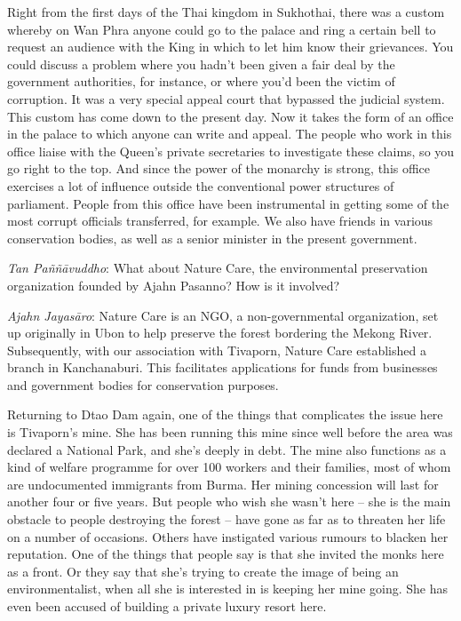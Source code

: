 Right from the first days of the Thai kingdom in Sukhothai, there was a
custom whereby on Wan Phra anyone could go to the palace and ring a
certain bell to request an audience with the King in which to let him
know their grievances. You could discuss a problem where you hadn't been
given a fair deal by the government authorities, for instance, or where
you'd been the victim of corruption. It was a very special appeal court
that bypassed the judicial system. This custom has come down to the
present day. Now it takes the form of an office in the palace to which
anyone can write and appeal. The people who work in this office liaise
with the Queen's private secretaries to investigate these claims, so you
go right to the top. And since the power of the monarchy is strong, this
office exercises a lot of influence outside the conventional power
structures of parliament. People from this office have been instrumental
in getting some of the most corrupt officials transferred, for example. 
We also have friends in various conservation bodies, as well as a senior
minister in the present government. 

\emph{Tan Paññāvuddho}: What about Nature Care, the environmental
preservation organization founded by Ajahn Pasanno? How is it involved? 

\emph{Ajahn Jayasāro}: Nature Care is an NGO, a non-governmental
organization, set up originally in Ubon to help preserve the forest
bordering the Mekong River. Subsequently, with our association with
Tivaporn, Nature Care established a branch in Kanchanaburi. This
facilitates applications for funds from businesses and government bodies
for conservation purposes. 

Returning to Dtao Dam again, one of the things that complicates the
issue here is Tivaporn's mine. She has been running this mine since well
before the area was declared a National Park, and she's deeply in debt. 
The mine also functions as a kind of welfare programme for over 100
workers and their families, most of whom are undocumented immigrants
from Burma. Her mining concession will last for another four or five
years. But people who wish she wasn't here -- she is the main obstacle
to people destroying the forest -- have gone as far as to threaten her
life on a number of occasions. Others have instigated various rumours to
blacken her reputation. One of the things that people say is that she
invited the monks here as a front. Or they say that she's trying to
create the image of being an environmentalist, when all she is
interested in is keeping her mine going. She has even been accused of
building a private luxury resort here. 

